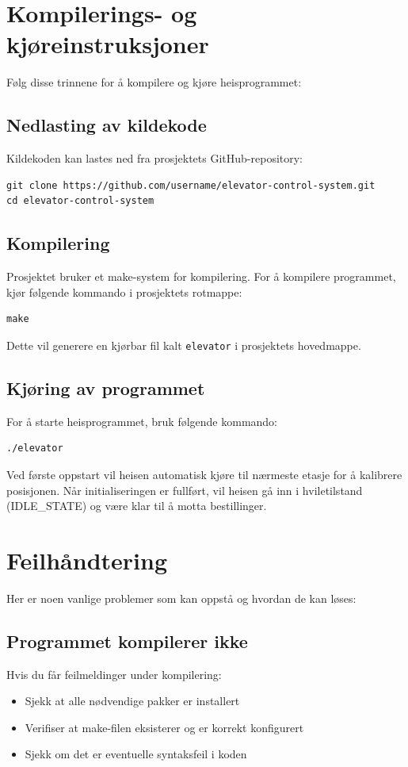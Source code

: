 \section{Kompilerings- og kjøreinstruksjoner}
Følg disse trinnene for å kompilere og kjøre heisprogrammet:

\subsection{Nedlasting av kildekode}
Kildekoden kan lastes ned fra prosjektets GitHub-repository:
\begin{lstlisting}[style=cpp]
git clone https://github.com/username/elevator-control-system.git
cd elevator-control-system
\end{lstlisting}

\subsection{Kompilering}
Prosjektet bruker et make-system for kompilering. For å kompilere programmet, kjør følgende kommando i prosjektets rotmappe:

\begin{lstlisting}[style=cpp]
make
\end{lstlisting}

Dette vil generere en kjørbar fil kalt \texttt{elevator} i prosjektets hovedmappe.

\subsection{Kjøring av programmet}
For å starte heisprogrammet, bruk følgende kommando:

\begin{lstlisting}[style=cpp]
./elevator
\end{lstlisting}

Ved første oppstart vil heisen automatisk kjøre til nærmeste etasje for å kalibrere posisjonen. Når initialiseringen er fullført, vil heisen gå inn i hviletilstand (IDLE\_STATE) og være klar til å motta bestillinger.

\section{Feilhåndtering}
Her er noen vanlige problemer som kan oppstå og hvordan de kan løses:

\subsection{Programmet kompilerer ikke}
Hvis du får feilmeldinger under kompilering:
\begin{itemize}
    \item Sjekk at alle nødvendige pakker er installert
    \item Verifiser at make-filen eksisterer og er korrekt konfigurert
    \item Sjekk om det er eventuelle syntaksfeil i koden
\end{itemize}

